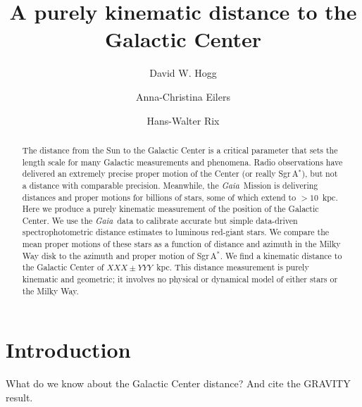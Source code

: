\documentclass[modern]{aastex62}
\newcommand{\project}[1]{\textsl{#1}}
\newcommand{\gaia}{\project{Gaia}}
\newcommand{\sagastar}{Sgr\,A$^{\ast}$}
\begin{document}
\sloppy\sloppypar\raggedbottom\frenchspacing %

\title{\textbf{%
A purely kinematic distance to the Galactic Center
}}

\author[0000-0003-2866-9403]{David W. Hogg}

\author[0000-0003-2895-6218]{Anna-Christina Eilers}

\author[0000-0003-4996-9069]{Hans-Walter Rix}

\begin{abstract}\noindent
The distance from the Sun to the Galactic Center is a critical parameter
that sets the length scale for many Galactic measurements and phenomena.
Radio observations have delivered an extremely precise proper motion
of the Center (or really \sagastar),
but not a distance with comparable precision.
Meanwhile, the \gaia\ Mission is delivering distances and proper motions for
billions of stars, some of which extend to $>10$~kpc.
Here we produce a purely kinematic measurement of the position of the
Galactic Center.
We use the \gaia\ data to calibrate accurate but simple data-driven
spectrophotometric distance estimates to luminous red-giant stars.
We compare the mean proper motions of these stars as a function of distance
and azimuth in the Milky Way disk to the azimuth and proper motion of
\sagastar.
We find a kinematic distance to the Galactic Center of $XXX\pm YYY$~kpc.
This distance measurement is purely kinematic and geometric;
it involves no physical or dynamical model of either stars or the Milky Way.
\end{abstract}


\section{Introduction} \label{sec:intro}

What do we know about the Galactic Center distance? And cite the GRAVITY result.
\end{document}
